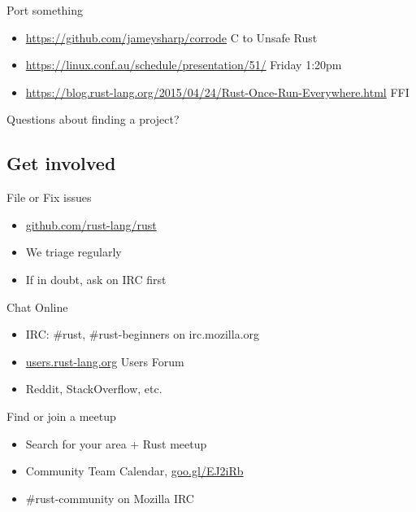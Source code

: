 \documentclass[50pt]{beamer}
\begin{document}
\begin{frame}
    Port something
    \begin{itemize}
        \item \url{https://github.com/jameysharp/corrode} C to Unsafe Rust
        \item \url{https://linux.conf.au/schedule/presentation/51/} Friday 1:20pm
        \item \url{https://blog.rust-lang.org/2015/04/24/Rust-Once-Run-Everywhere.html} FFI
    \end{itemize}
\end{frame}

\begin{frame}
    Questions about finding a project?
\end{frame}

\subsection{Get involved}

\begin{frame}
    File or Fix issues
    \begin{itemize}
        \item \url{github.com/rust-lang/rust}
        \item We triage regularly
        \item If in doubt, ask on IRC first
    \end{itemize}
\end{frame}

\begin{frame}
    Chat Online
    \begin{itemize}
        \item IRC: \#rust, \#rust-beginners on irc.mozilla.org
        \item \url{users.rust-lang.org} Users Forum
        \item Reddit, StackOverflow, etc.
    \end{itemize}
\end{frame}

\begin{frame}
    Find or join a meetup
    \begin{itemize}
        \item Search for your area + Rust meetup
        \item Community Team Calendar, \url{goo.gl/EJ2iRb}
        \item \#rust-community on Mozilla IRC
    \end{itemize}
\end{frame}
\end{document}
